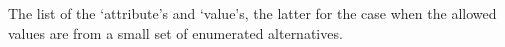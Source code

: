 \documentclass[aps, prx, showpacs, twocolumn, superscriptaddress, notitlepage, longbibliography, floatfix, nofootinbib]{revtex4-2}
\newif\ifIncremental
\newcommand{\myKey}[1]{$\whitearrowupfrombar$\textit{#1}}
\renewcommand{\myKey}[1]{\textit{#1}}
\renewcommand{\myKey}[1]{`{#1}'}
\newcommand{\val}[1]{\rotatebox[origin=c]{180}{$\whitearrowupfrombar$}\textit{#1}}
\renewcommand{\val}[1]{\myKey{#1}}
\newcommand{\separate}[1]
{
 #1
}
\begin{document}
\separate{The list of the \val{attribute}s and \val{value}s, the latter for the case when the allowed values are from a small set of enumerated alternatives.}

\begin{description}[leftmargin=5mm, topsep=0mm]

\end{description}

\onecolumngrid


\ifIncremental

\else

\fi
\end{document}
